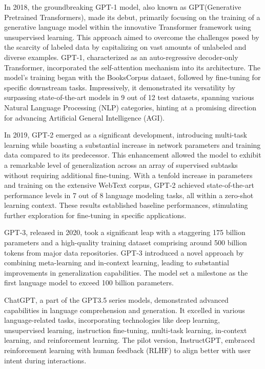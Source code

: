\documentclass[conference]{IEEEtran}
\begin{document}
In 2018, the groundbreaking GPT-1 model, also known as GPT(Generative Pretrained Transformers), made its debut, primarily focusing on the training of a generative language model within the innovative Transformer framework using unsupervised learning. This approach aimed to overcome the challenges posed by the scarcity of labeled data by capitalizing on vast amounts of unlabeled and diverse examples. GPT-1, characterized as an auto-regressive decoder-only Transformer, incorporated the self-attention mechanism into its architecture. The model's training began with the BooksCorpus dataset, followed by fine-tuning for specific downstream tasks. Impressively, it demonstrated its versatility by surpassing state-of-the-art models in 9 out of 12 test datasets, spanning various Natural Language Processing (NLP) categories, hinting at a promising direction for advancing Artificial General Intelligence (AGI).

In 2019, GPT-2 emerged as a significant development, introducing multi-task learning while boasting a substantial increase in network parameters and training data compared to its predecessor. This enhancement allowed the model to exhibit a remarkable level of generalization across an array of supervised subtasks without requiring additional fine-tuning. With a tenfold increase in parameters and training on the extensive WebText corpus, GPT-2 achieved state-of-the-art performance levels in 7 out of 8 language modeling tasks, all within a zero-shot learning context. These results established baseline performances, stimulating further exploration for fine-tuning in specific applications.

GPT-3, released in 2020, took a significant leap with a staggering 175 billion parameters and a high-quality training dataset comprising around 500 billion tokens from major data repositories. GPT-3 introduced a novel approach by combining meta-learning and in-context learning, leading to substantial improvements in generalization capabilities. The model set a milestone as the first language model to exceed 100 billion parameters.

ChatGPT, a part of the GPT3.5 series models, demonstrated advanced capabilities in language comprehension and generation. It excelled in various language-related tasks, incorporating technologies like deep learning, unsupervised learning, instruction fine-tuning, multi-task learning, in-context learning, and reinforcement learning. The pilot version, InstructGPT, embraced reinforcement learning with human feedback (RLHF) to align better with user intent during interactions.
\end{document}
